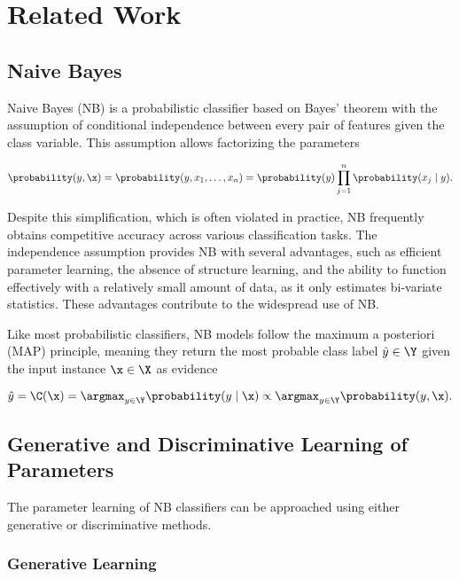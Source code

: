 \section{Related Work}
\label{sec:relatedWork}


\subsection{Naive Bayes}\label{subsec:NB}

Naive Bayes (NB) \cite{Webb2010} is a probabilistic classifier based on Bayes' theorem with the assumption of conditional independence between every pair of features given the class variable. This assumption allows factorizing the parameters

\begin{equation*}
\probability(y, \x) = \probability(y,x_1,\dots,x_n) = \probability(y) \prod_{j = 1}^{n} \probability(x_j \mid y).
\end{equation*}

Despite this simplification, which is often violated in practice, NB frequently obtains competitive accuracy across various classification tasks. The independence assumption provides NB with several advantages, such as efficient parameter learning, the absence of structure learning, and the ability to function effectively with a relatively small amount of data, as it only estimates bi-variate statistics. These advantages contribute to the widespread use of NB.

Like most probabilistic classifiers, NB models follow the maximum a posteriori (MAP) principle, meaning they return the most probable class label \(\hat{y} \in \Y\) given the input instance \(\x \in \X\) as evidence

\begin{equation*}
    \hat{y} = \C(\x) = \argmax_{y \in \Y} \probability(y \mid \x) \propto \argmax_{y \in \Y} \probability(y, \x).
\end{equation*}

\subsection{Generative and Discriminative Learning of Parameters}\label{subsec:genDiscNB}

The parameter learning of NB classifiers can be approached using either generative or discriminative methods.

\subsubsection{Generative Learning}


